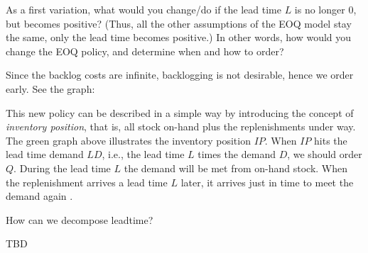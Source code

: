 \begin{question}
  As a first variation, what would you change/do if the lead time $L$
  is no longer 0, but becomes positive? (Thus, all the other
  assumptions of the EOQ model stay the same, only the lead time
  becomes positive.)  In other words, how would you change the EOQ
  policy, and determine when and how to order?
  \begin{solution}
    Since the backlog costs are infinite, backlogging is not
    desirable, hence we order early. See the graph: 
\begin{center}
\end{center}
    
This new policy can be described in a simple way by introducing the
concept of \emph{inventory position}, that is, all stock on-hand plus
the replenishments under way. The green graph above illustrates the
inventory position $IP$. When $IP$ hits the lead time demand $L D$,
i.e., the lead time $L$ times the demand $D$, we should order
$Q$. During the lead time $L$ the demand will be met from on-hand
stock. When the replenishment arrives a lead time $L$ later, it
arrives just in time to meet the demand again .
  \end{solution}
\end{question}

\begin{question}

How can we decompose leadtime?

\begin{solution}
TBD
\end{solution}

\end{question}



